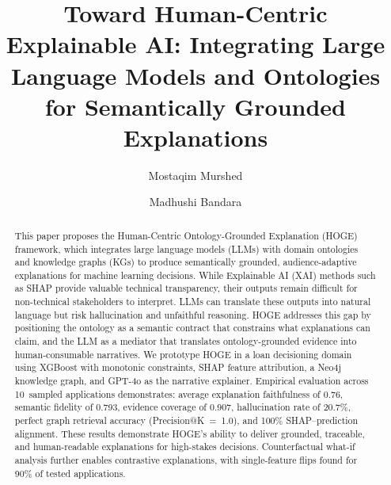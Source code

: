 \documentclass[lnbip]{svmultln}
\begin{document}
%
\mainmatter              %
%
\title{Toward Human-Centric Explainable AI: Integrating Large Language Models and Ontologies for Semantically Grounded Explanations}
%
%
\author{Mostaqim Murshed \and Madhushi Bandara}
%
%
%

\maketitle              %

\begin{abstract}
This paper proposes the Human-Centric Ontology-Grounded Explanation (HOGE) framework, which integrates large language models (LLMs) with domain ontologies and knowledge graphs (KGs) to produce semantically grounded, audience-adaptive explanations for machine learning decisions. While Explainable AI (XAI) methods such as SHAP provide valuable technical transparency, their outputs remain difficult for non-technical stakeholders to interpret. LLMs can translate these outputs into natural language but risk hallucination and unfaithful reasoning. HOGE addresses this gap by positioning the ontology as a semantic contract that constrains what explanations can claim, and the LLM as a mediator that translates ontology-grounded evidence into human-consumable narratives. We prototype HOGE in a loan decisioning domain using XGBoost with monotonic constraints, SHAP feature attribution, a Neo4j knowledge graph, and GPT-4o as the narrative explainer. Empirical evaluation across 10~sampled applications demonstrates: average explanation faithfulness of 0.76, semantic fidelity of 0.793, evidence coverage of 0.907, hallucination rate of 20.7\%, perfect graph retrieval accuracy (Precision@K~=~1.0), and 100\% SHAP--prediction alignment. These results demonstrate HOGE's ability to deliver grounded, traceable, and human-readable explanations for high-stakes decisions. Counterfactual what-if analysis further enables contrastive explanations, with single-feature flips found for 90\% of tested applications.
\end{abstract}
%
\end{document}
